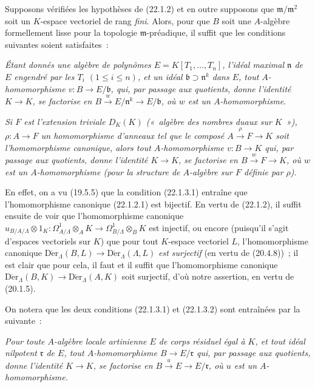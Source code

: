 \begin{remark}[22.1.3]
\label{0.22.1.3-fr}
Supposons vérifiées les hypothèses de (22.1.2) et en outre supposons que
$\mathfrak m/\mathfrak m^2$ soit un $K$-espace vectoriel de rang \emph{fini}.
Alors, pour que $B$ soit une $A$-algèbre formellement lisse pour la topologie
$\mathfrak m$-préadique, il suffit que les conditions suivantes soient
satisfaites~:

\begin{env}[22.1.3.1]
\label{0.22.1.3.1-fr}
\itshape Étant donnés une algèbre de polynômes $E=K[T_1,\ldots,T_n]$, l'idéal maximal
$\mathfrak n$ de $E$ engendré par les $T_i$ $(1\leqslant i\leqslant n)$, et
un idéal $\mathfrak b\supset\mathfrak n^k$ dans $E$, tout
$A$-homomorphisme $v:B\to E/\mathfrak b$, qui, par passage aux
quotients, donne l'identité $K\to K$, se factorise en
$B\xrightarrow{w}E/\mathfrak n^k\to E/\mathfrak b$,
où $w$ est un $A$-homomorphisme.
\end{env}

\begin{env}[22.1.3.2]
\label{0.22.1.3.2-fr}
\itshape Si $F$ est l'extension triviale $D_K(K)$ \textup{(«~algèbre des nombres duaux sur
$K$~»)}, $\rho:A\to F$ un homomorphisme d'anneaux tel que le composé
$A\xrightarrow{\rho}F\to K$ soit l'homomorphisme canonique, alors tout
$A$-homomorphisme $v:B\to K$ qui, par passage aux quotients, donne
l'identité $K\to K$, se factorise en
$B\xrightarrow{w}F\to K$,
où $w$ est un $A$-homomorphisme (pour la structure de $A$-algèbre sur
$F$ définie par $\rho$).
\end{env}

En effet, on a vu (19.5.5) que la condition (22.1.3.1) entraîne que
l'homomorphisme canonique (22.1.2.1) est bijectif. En vertu de (22.1.2), il
suffit ensuite de voir que l'homomorphisme canonique
$u_{B/A/\Lambda}\otimes1_K:\Omega^1_{A/\Lambda}\otimes_AK\to\Omega^1_{B/\Lambda}\otimes_BK$
est injectif, ou encore (puisqu'il s'agit d'espaces vectoriels sur $K$) que
pour tout $K$-espace vectoriel $L$, l'homomorphisme canonique
$\operatorname{D\acute{e}r}_\Lambda(B,L)\to\operatorname{D\acute{e}r}_\Lambda(\Lambda,L)$ \emph{est
surjectif} (en vertu de (20.4.8))~; il est clair que pour cela, il faut
et il suffit que l'homomorphisme canonique
$\operatorname{D\acute{e}r}_\Lambda(B,K)\to\operatorname{D\acute{e}r}_\Lambda(A,K)$ soit
surjectif, d'où notre assertion, en vertu de (20.1.5).

On notera que les deux conditions (22.1.3.1) et (22.1.3.2) sont entraînées
par la suivante~:

\begin{env}[22.1.3.3]
\label{0.22.1.3.3-fr}
\itshape Pour toute $A$-algèbre locale \textup{artinienne} $E$ de corps résiduel \textup{égal à}
$K$, et tout idéal nilpotent $\mathfrak r$ de $E$, tout
$A$-homomorphisme $B\to E/\mathfrak r$ qui, par passage aux quotients,
donne l'identité $K\to K$, se factorise en
$B\xrightarrow{u}E\to E/\mathfrak r$, où $u$ est un
$A$-homomorphisme.
\end{env}
\end{remark}

